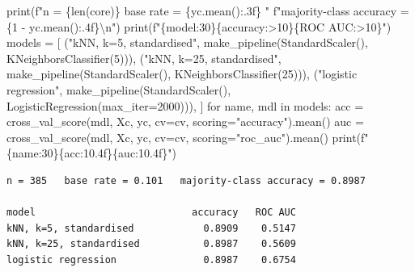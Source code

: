 \documentclass[
  letterpaper,
  10pt,
  twoside,
  openright,
  numbers=noenddot,
  chapterprefix=true]{scrbook}
\newenvironment{Shaded}{}{}
\newcommand{\BuiltInTok}[1]{\textcolor[rgb]{0.84,0.23,0.29}{#1}}
\newcommand{\CharTok}[1]{\textcolor[rgb]{0.01,0.18,0.38}{#1}}
\newcommand{\ControlFlowTok}[1]{\textcolor[rgb]{0.84,0.23,0.29}{#1}}
\newcommand{\DecValTok}[1]{\textcolor[rgb]{0.00,0.36,0.77}{#1}}
\newcommand{\KeywordTok}[1]{\textcolor[rgb]{0.84,0.23,0.29}{#1}}
\newcommand{\NormalTok}[1]{\textcolor[rgb]{0.14,0.16,0.18}{#1}}
\newcommand{\OperatorTok}[1]{\textcolor[rgb]{0.14,0.16,0.18}{#1}}
\newcommand{\SpecialCharTok}[1]{\textcolor[rgb]{0.00,0.36,0.77}{#1}}
\newcommand{\SpecialStringTok}[1]{\textcolor[rgb]{0.01,0.18,0.38}{#1}}
\newcommand{\StringTok}[1]{\textcolor[rgb]{0.01,0.18,0.38}{#1}}
\begin{document}
\begin{Shaded}
\begin{Highlighting}[]
\BuiltInTok{print}\NormalTok{(}\SpecialStringTok{f"n = }\SpecialCharTok{\{}\BuiltInTok{len}\NormalTok{(core)}\SpecialCharTok{\}}\SpecialStringTok{   base rate = }\SpecialCharTok{\{}\NormalTok{yc}\SpecialCharTok{.}\NormalTok{mean()}\SpecialCharTok{:.3f\}}\SpecialStringTok{   "}
      \SpecialStringTok{f"majority{-}class accuracy = }\SpecialCharTok{\{}\DecValTok{1} \OperatorTok{{-}}\NormalTok{ yc}\SpecialCharTok{.}\NormalTok{mean()}\SpecialCharTok{:.4f\}}\CharTok{\textbackslash{}n}\SpecialStringTok{"}\NormalTok{)}
\BuiltInTok{print}\NormalTok{(}\SpecialStringTok{f"}\SpecialCharTok{\{}\StringTok{\textquotesingle{}model\textquotesingle{}}\SpecialCharTok{:30\}\{}\StringTok{\textquotesingle{}accuracy\textquotesingle{}}\SpecialCharTok{:\textgreater{}10\}\{}\StringTok{\textquotesingle{}ROC AUC\textquotesingle{}}\SpecialCharTok{:\textgreater{}10\}}\SpecialStringTok{"}\NormalTok{)}
\NormalTok{models }\OperatorTok{=}\NormalTok{ [}
\NormalTok{    (}\StringTok{"kNN, k=5, standardised"}\NormalTok{,  make\_pipeline(StandardScaler(), KNeighborsClassifier(}\DecValTok{5}\NormalTok{))),}
\NormalTok{    (}\StringTok{"kNN, k=25, standardised"}\NormalTok{, make\_pipeline(StandardScaler(), KNeighborsClassifier(}\DecValTok{25}\NormalTok{))),}
\NormalTok{    (}\StringTok{"logistic regression"}\NormalTok{,     make\_pipeline(StandardScaler(), LogisticRegression(max\_iter}\OperatorTok{=}\DecValTok{2000}\NormalTok{))),}
\NormalTok{]}
\ControlFlowTok{for}\NormalTok{ name, mdl }\KeywordTok{in}\NormalTok{ models:}
\NormalTok{    acc }\OperatorTok{=}\NormalTok{ cross\_val\_score(mdl, Xc, yc, cv}\OperatorTok{=}\NormalTok{cv, scoring}\OperatorTok{=}\StringTok{"accuracy"}\NormalTok{).mean()}
\NormalTok{    auc }\OperatorTok{=}\NormalTok{ cross\_val\_score(mdl, Xc, yc, cv}\OperatorTok{=}\NormalTok{cv, scoring}\OperatorTok{=}\StringTok{"roc\_auc"}\NormalTok{).mean()}
    \BuiltInTok{print}\NormalTok{(}\SpecialStringTok{f"}\SpecialCharTok{\{}\NormalTok{name}\SpecialCharTok{:30\}\{}\NormalTok{acc}\SpecialCharTok{:10.4f\}\{}\NormalTok{auc}\SpecialCharTok{:10.4f\}}\SpecialStringTok{"}\NormalTok{)}
\end{Highlighting}
\end{Shaded}

\begin{verbatim}
n = 385   base rate = 0.101   majority-class accuracy = 0.8987

model                           accuracy   ROC AUC
kNN, k=5, standardised            0.8909    0.5147
kNN, k=25, standardised           0.8987    0.5609
logistic regression               0.8987    0.6754
\end{verbatim}
\end{document}

